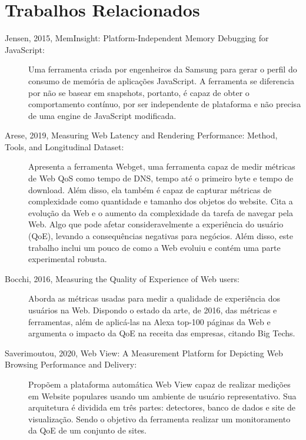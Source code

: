 \documentclass[12pt]{tcc}
\begin{document}
\chapter{Trabalhos Relacionados}
\label{sec:trabalhos_relacionados}
	\label{sec:trab_relacionados}

\begin{description}

	\item[Jensen, 2015, MemInsight: Platform-Independent Memory Debugging for JavaScript:]
	Uma ferramenta criada por engenheiros da Samsung para gerar o perfil do consumo de memória de aplicações JavaScript.
	A ferramenta se diferencia por não se basear em snapshots, portanto, é capaz de obter o comportamento contínuo, por ser independente de plataforma e não precisa de uma engine de JavaScript modificada.
	
	\item[Arese, 2019, Measuring Web Latency and Rendering Performance: Method, Tools, and Longitudinal Dataset:]
	Apresenta a ferramenta Webget, uma ferramenta capaz de medir métricas de Web QoS como tempo de DNS, tempo até o primeiro byte e tempo de download. Além disso, ela também é capaz de capturar métricas de complexidade como quantidade e tamanho dos objetos do website.
	Cita a evolução da Web e o aumento da complexidade da tarefa de navegar pela Web. Algo que pode afetar consideravelmente a experiência do usuário (QoE), levando a consequências negativas para negócios. Além disso, este trabalho inclui um pouco de como a Web evoluiu e contém uma parte experimental robusta.

	\item[Bocchi, 2016, Measuring the Quality of Experience of Web users:]
	Aborda as métricas usadas para medir a qualidade de experiência dos usuários na Web. Dispondo o estado da arte, de 2016, das métricas e ferramentas, além de aplicá-las na Alexa top-100 páginas da Web e argumenta o impacto da QoE na receita das empresas, citando Big Techs.

	\item[Saverimoutou, 2020, Web View: A Measurement Platform for Depicting Web Browsing Performance and Delivery:]
	Propõem a plataforma automática Web View capaz de realizar medições em Website populares usando um ambiente de usuário representativo. Sua arquitetura é dividida em três partes: detectores, banco de dados e site de visualização. Sendo o objetivo da ferramenta realizar um monitoramento da QoE de um conjunto de sites.


\end{description}
\end{document}
